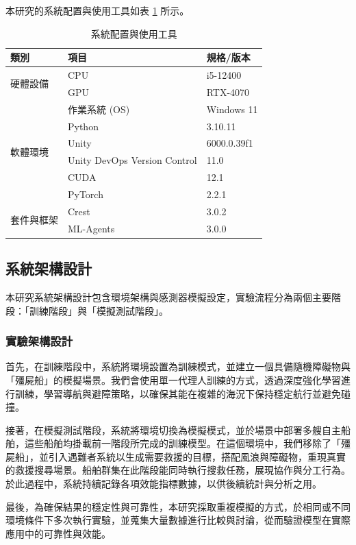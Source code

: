 \documentclass[12pt,a4paper]{article}
\begin{document}
本研究的系統配置與使用工具如表 \ref{tab:system_config} 所示。

\begin{table}[h]
\centering
\caption{系統配置與使用工具}
\label{tab:system_config}
\begin{tabular}{lll}
\hline
\textbf{類別}     & \textbf{項目}                    & \textbf{規格/版本}  \\ \hline
\multirow{2}{*}{硬體設備} 
                  & CPU                              & i5-12400            \\
                  & GPU                              & RTX-4070            \\ \hline
\multirow{6}{*}{軟體環境} 
                  & 作業系統 (OS)                    & Windows 11          \\
                  & Python                           & 3.10.11             \\
                  & Unity                            & 6000.0.39f1         \\
                  & Unity DevOps Version Control     & 11.0                \\
                  & CUDA                             & 12.1                \\
                  & PyTorch                          & 2.2.1               \\ \hline
\multirow{2}{*}{套件與框架} 
                  & Crest                            & 3.0.2               \\
                  & ML-Agents                        & 3.0.0               \\ \hline
\end{tabular}
\end{table}

\newpage

\subsection{系統架構設計}
本研究系統架構設計包含環境架構與感測器模擬設定，實驗流程分為兩個主要階段：「訓練階段」與「模擬測試階段」。

\subsubsection{實驗架構設計}
首先，在訓練階段中，系統將環境設置為訓練模式，並建立一個具備隨機障礙物與「殭屍船」的模擬場景。我們會使用單一代理人訓練的方式，透過深度強化學習進行訓練，學習導航與避障策略，以確保其能在複雜的海況下保持穩定航行並避免碰撞。
\\ \par
接著，在模擬測試階段，系統將環境切換為模擬模式，並於場景中部署多艘自主船舶，這些船舶均掛載前一階段所完成的訓練模型。在這個環境中，我們移除了「殭屍船」，並引入遇難者系統以生成需要救援的目標，搭配風浪與障礙物，重現真實的救援搜尋場景。船舶群集在此階段能同時執行搜救任務，展現協作與分工行為。於此過程中，系統持續記錄各項效能指標數據，以供後續統計與分析之用。
\\ \par
最後，為確保結果的穩定性與可靠性，本研究採取重複模擬的方式，於相同或不同環境條件下多次執行實驗，並蒐集大量數據進行比較與討論，從而驗證模型在實際應用中的可靠性與效能。
\end{document}
